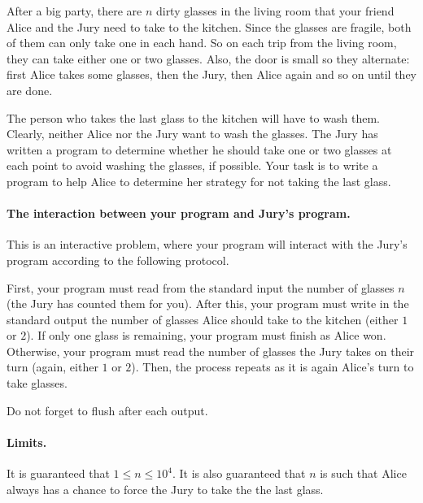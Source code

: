 After a big party, there are $n$ dirty glasses in the living room that your friend Alice and the Jury need to take to the kitchen.
Since the glasses are fragile, both of them can only take one in each hand.
So on each trip from the living room, they can take either one or two glasses.
Also, the door is small so they alternate: first Alice takes some glasses, then the Jury, then Alice again and so on until they are done.

The person who takes the last glass to the kitchen will have to wash them.
Clearly, neither Alice nor the Jury want to wash the glasses.
The Jury has written a program to determine whether he should take one or two glasses at each point to avoid washing the glasses, if possible.
Your task is to write a program to help Alice to determine her strategy for not taking the last glass.

\paragraph{The interaction between your program and Jury's program.}
This is an interactive problem, where your program will interact with the Jury's program according to the following protocol.

First, your program must read from the standard input the number of glasses $n$ (the Jury has counted them for you).
After this, your program must write in the standard output the number of glasses Alice should take to the kitchen (either $1$ or $2$).
If only one glass is remaining, your program must finish as Alice won.
Otherwise, your program must read the number of glasses the Jury takes on their turn (again, either $1$ or $2$).
Then, the process repeats as it is again Alice's turn to take glasses.

Do not forget to flush after each output.

\paragraph{Limits.}
It is guaranteed that $1 \leq n \leq 10^4$.
It is also guaranteed that $n$ is such that Alice always has a chance to force the Jury to take the the last glass.
{
\renewcommand{\sampleinputname}{Jury's output}
\renewcommand{\sampleoutputname}{Your output}
}
